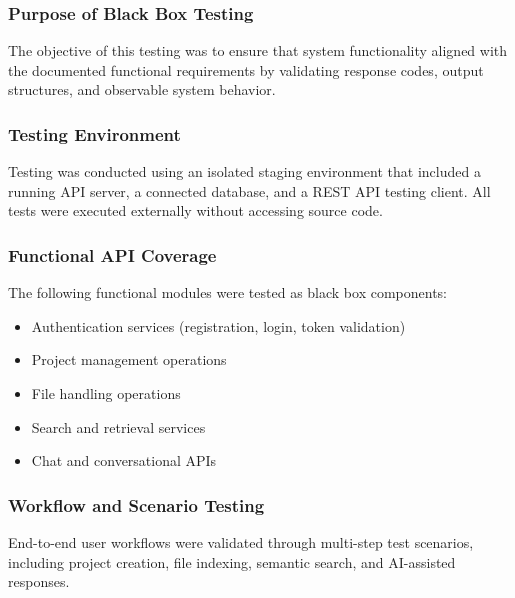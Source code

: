\subsubsection{Purpose of Black Box Testing}

The objective of this testing was to ensure that system functionality aligned with the documented functional requirements by validating response codes, output structures, and observable system behavior.

\subsubsection{Testing Environment}

Testing was conducted using an isolated staging environment that included a running API server, a connected database, and a REST API testing client. All tests were executed externally without accessing source code.


\subsubsection{Functional API Coverage}

The following functional modules were tested as black box components:

\begin{itemize}
    \item Authentication services (registration, login, token validation)
    \item Project management operations
    \item File handling operations
    \item Search and retrieval services
    \item Chat and conversational APIs
\end{itemize}


\subsubsection{Workflow and Scenario Testing}

End-to-end user workflows were validated through multi-step test scenarios, including project creation, file indexing, semantic search, and AI-assisted responses.


